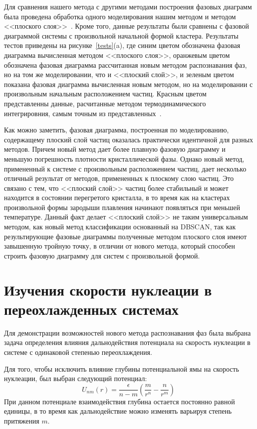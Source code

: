 Для сравнения нашего метода с другими методами построения фазовых диаграмм была проведена обработка одного моделирования нашим методом и методом <<плоского слоя>>~\cite{10.1021/jp806127j, 10.1021/jp1117213}.
Кроме того, данные результаты были сравнены с фазовой диаграммой системы с произвольной начальной формой кластера.
Результаты тестов приведены на рисунке~\ref{tests}(a), где синим цветом обозначена фазовая диаграмма вычисленная методом <<плоского слоя>>, оранжевым цветом обозначена фазовая диаграмма рассчитанная новым методом распознавания фаз, но на том же моделировании, что и <<плоский слой>>, и зеленым цветом показана фазовая диаграмма вычисленная новым методом, но на моделировании с произвольным начальным расположением частиц. Красным цветом представленны данные, расчитанные методом термодинамического интегрировния, самым точным из представленных~\cite{10.1080/00268976.2019.1699185}.

Как можно заметить, фазовая диаграмма, построенная по моделированию, содержащему плоский слой частиц оказалась практически идентичной для разных методов.
Причем новый метод дает более плавную фазовую диаграмму и меньшую погрешность плотности кристаллической фазы.
Однако новый метод, примененный к системе с произвольным расположением частиц, дает несколько отличный результат от методов, примененных к плоскому слою частиц.
Это связано с тем, что <<плоский слой>> частиц более стабильный и может находится в состоянии перегретого кристалла, в то время как на кластерах произвольной формы зародыши плавления начинают появляться при меньшей температуре.
Данный факт делает <<плоский слой>> не таким универсальным методом, как новый метод классификации основанный на DBSCAN, так как результирующие фазовые диаграммы полученные методом плоского слоя имеют завышенную тройную точку, в отличии от нового метода, который способен строить фазовую диаграмму для систем с произвольной формой.


\section{Изучения скорости нуклеации в переохлажденных системах}
\label{PRIMe-SecNucleation}

Для демонстрации возможностей нового метода распознавания фаз была выбрана задача определения влияния дальнодействия потенциала на скорость нуклеации в системе с одинаковой степенью переохлаждения.

Для того, чтобы исключить влияние глубины потенциальной ямы на скорость нуклеации, был выбран следующий потенциал:
\begin{equation}
U_{nm}(r)=\frac{\epsilon}{n-m}\left(\frac{m}{r^n}-\frac{n}{r^m}\right) \label{NMP-eq1}
\end{equation}
При данном потенциале взаимодействия глубина остается постоянно равной единицы, в то время как дальнодействие можно изменять варьируя степень притяжения $m$.

